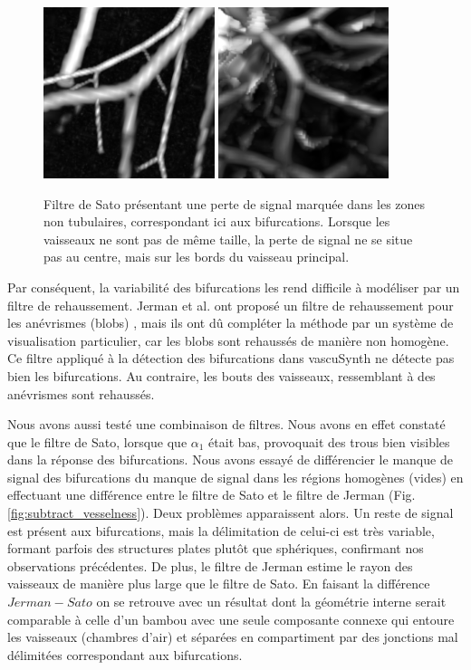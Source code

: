 \begin{figure}[ht]
    \centering
    \includegraphics[height=5cm]{Images/Vascu_2_k_Sato.png}
    \includegraphics[height=5cm]{Images/Ircad_k_Sato.png}
    \caption{Filtre de Sato présentant une perte de signal marquée dans les zones non tubulaires, correspondant ici aux bifurcations. Lorsque les vaisseaux ne sont pas de même taille, la perte de signal ne se situe pas au centre, mais sur les bords du vaisseau principal.}
    \label{fig:gradient_shift}
\end{figure}


Par conséquent, la variabilité des bifurcations les rend difficile à modéliser par un filtre de rehaussement. Jerman et al. ont proposé un filtre de rehaussement pour les anévrismes (blobs) \cite{Jerman2015_blobness}, mais ils ont dû compléter la méthode par un système de visualisation particulier, car les blobs sont rehaussés de manière non homogène. Ce filtre appliqué à la détection des bifurcations dans vascuSynth ne détecte pas bien les bifurcations. Au contraire, les bouts des vaisseaux, ressemblant à des anévrismes sont rehaussés.

Nous avons aussi testé une combinaison de filtres. Nous avons en effet constaté que le filtre de Sato, lorsque que $\alpha_1$ était bas, provoquait des trous bien visibles dans la réponse des bifurcations. Nous avons essayé de différencier le manque de signal des bifurcations du manque de signal dans les régions homogènes (vides) en effectuant une différence entre le filtre de Sato et le filtre de Jerman (Fig. \ref{fig:subtract_vesselness}). Deux problèmes apparaissent alors. Un reste de signal est présent aux bifurcations, mais la délimitation de celui-ci est très variable, formant parfois des structures plates plutôt que sphériques, confirmant nos observations précédentes. De plus, le filtre de Jerman estime le rayon des vaisseaux de manière plus large que le filtre de Sato. En faisant la différence $Jerman-Sato$ on se retrouve avec un résultat dont la géométrie interne serait comparable à celle d'un bambou avec une seule composante connexe qui entoure les vaisseaux (chambres d'air) et séparées en compartiment par des jonctions mal délimitées correspondant aux bifurcations.

